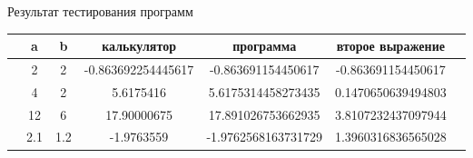 \documentclass[a4paper]{article}
\begin{document}
    \begin{result}
        Результат тестирования программ
        \begin{center}
            \begin{tabular}{c|c|c|c|c|cc}
                 & a & b & калькулятор & программа & второе выражение &\\
                 \hline
                 & 2 & 2 & -0.863692254445617 & -0.863691154450617 & -0.863691154450617\\
                 \hline
                 & 4 & 2 & 5.6175416 & 5.6175314458273435 & 0.1470650639494803\\
                 \hline
                 & 12 & 6 & 17.90000675 & 17.891026753662935 & 3.8107232437097944\\
                 \hline
                 & 2.1 & 1.2 & -1.9763559 & -1.9762568163731729 & 1.3960316836565028
                 \hline
            \end{tabular}
    
        \end{center}
        
    \end{result}
    
\end{document}
